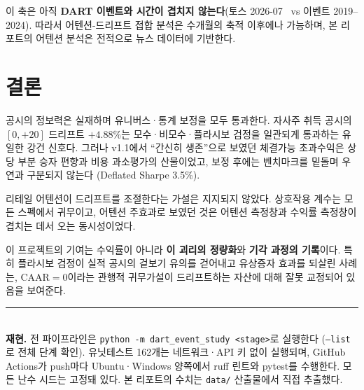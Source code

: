 \documentclass[11pt,a4paper]{article}
\newcommand{\sig}[1]{\textbf{#1}}
\begin{document}
이 축은 아직 \sig{DART 이벤트와 시간이 겹치지 않는다}(토스 2026-07~ vs 이벤트 2019--2024).
따라서 어텐션-드리프트 접합 분석은 수개월의 축적 이후에나 가능하며, 본 리포트의 어텐션 분석은
전적으로 뉴스 데이터에 기반한다.

\section{결론}

공시의 정보력은 실재하며 유니버스·통계 보정을 모두 통과한다. 자사주 취득 공시의
$[0,+20]$ 드리프트 $+4.88\%$는 모수·비모수·플라시보 검정을 일관되게 통과하는 유일한 강건
신호다. 그러나 v1.1에서 ``간신히 생존''으로 보였던 체결가능 초과수익은 상당 부분 승자 편향과
비용 과소평가의 산물이었고, 보정 후에는 벤치마크를 밑돌며 우연과 구분되지 않는다
(Deflated Sharpe 3.5\%).

리테일 어텐션이 드리프트를 조절한다는 가설은 지지되지 않았다. 상호작용 계수는 모든 스펙에서
귀무이고, 어텐션 주효과로 보였던 것은 어텐션 측정창과 수익률 측정창이 겹치는 데서 오는 동시성이었다.

이 프로젝트의 기여는 수익률이 아니라 \sig{이 괴리의 정량화}와 \sig{기각 과정의 기록}이다.
특히 플라시보 검정이 실적 공시의 겉보기 유의를 걷어내고 유상증자 효과를 되살린 사례는,
$\mathrm{CAAR}=0$이라는 관행적 귀무가설이 드리프트하는 자산에 대해 잘못 교정되어 있음을 보여준다.

\vspace{0.5cm}
\noindent\rule{\textwidth}{0.4pt}\\
\small
\textbf{재현.} 전 파이프라인은 \texttt{python -m dart\_event\_study <stage>}로 실행한다
(\texttt{--list}로 전체 단계 확인). 유닛테스트 162개는 네트워크·API 키 없이 실행되며,
GitHub Actions가 push마다 Ubuntu·Windows 양쪽에서 ruff 린트와 pytest를 수행한다.
모든 난수 시드는 고정돼 있다. 본 리포트의 수치는 \texttt{data/} 산출물에서 직접 추출했다.
\end{document}
